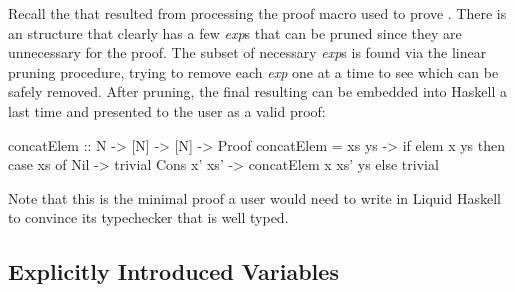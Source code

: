 Recall the \LangBTerm that resulted from processing the proof macro used to prove .
There is an  structure that clearly has a few \textit{exp}s that can be pruned since they are unnecessary for the proof.
The subset of necessary \textit{exp}s is found via the linear pruning procedure, trying to remove each \textit{exp} one at a time to see which can be safely removed.
After pruning, the final resulting \LangBTerm can be embedded into Haskell a last time and presented to the user as a valid proof:

\begin{code}
  concatElem :: N -> [N] -> [N] -> Proof
  concatElem = \x xs ys ->
    if elem x ys then
      case xs of
        Nil -> trivial
        Cons x' xs' -> concatElem x xs' ys
    else
      trivial
\end{code}
%
Note that this is the minimal proof a user would need to write
in Liquid Haskell to convince its typechecker that 
is well typed.

\subsection{Explicitly Introduced Variables}


